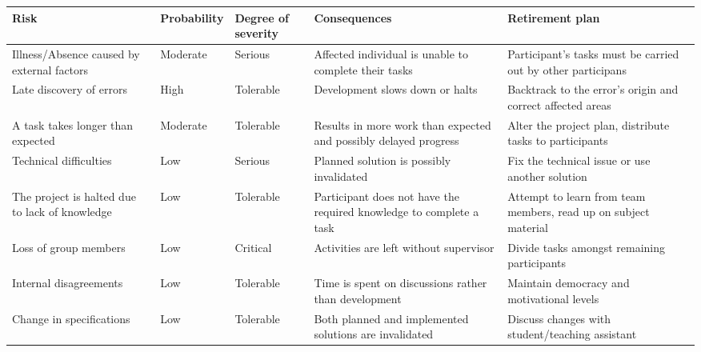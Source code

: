 \documentclass{article}
\begin{document}
\begin{tabular}{|p{3cm}|p{2cm}|p{2cm}|p{4cm}|p{4cm}|}
\hline
Risk & Probability & Degree of severity & Consequences & Retirement plan \\ 
\hline
Illness/Absence caused by external factors & Moderate & Serious & Affected
individual is unable to complete their tasks & Participant's tasks must be
carried out by other participans \\ \hline
Late discovery of errors & High & Tolerable & Development slows down or halts
& Backtrack to the error's origin and correct affected areas \\ \hline
A task takes longer than expected & Moderate & Tolerable & Results in more
work than expected and possibly delayed progress & Alter the project plan,
distribute tasks to participants \\ \hline
Technical difficulties & Low & Serious & Planned solution is possibly
invalidated & Fix the technical issue or use another solution \\ \hline
The project is halted due to lack of knowledge & Low & Tolerable & 
Participant does not have the required knowledge to complete a task & 
Attempt to learn from team members, read up on subject material \\ \hline
Loss of group members & Low & Critical & Activities are left without
supervisor & Divide tasks amongst remaining participants \\ \hline
Internal disagreements & Low & Tolerable & Time is spent on discussions
rather than development & Maintain democracy and motivational levels \\ 
\hline
Change in specifications & Low & Tolerable & Both planned and implemented
solutions are invalidated & Discuss changes with student/teaching assistant
\\ \hline
\end{tabular}

\bigskip
\end{document}
